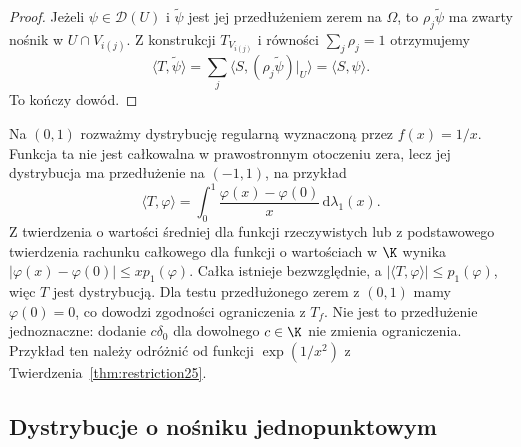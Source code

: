 \begin{proof}
Jeżeli $\psi\in\mathcal D(U)$ i $\widetilde\psi$
jest jej przedłużeniem zerem na $\Omega$, to
$\rho_j\widetilde\psi$ ma zwarty nośnik w $U\cap V_{i(j)}$.
Z konstrukcji $T_{V_{i(j)}}$ i równości $\sum_j\rho_j=1$
otrzymujemy
\[
 \langle T,\widetilde\psi\rangle
 =\sum_j\langle S,(\rho_j\widetilde\psi)|_U\rangle
 =\langle S,\psi\rangle.
\]
To kończy dowód.
\end{proof}

\begin{przyklad}
\label{ex:dt-extension-inverse-x}
Na $(0,1)$ rozważmy dystrybucję regularną wyznaczoną
przez $f(x)=1/x$. Funkcja ta nie jest całkowalna
w prawostronnym otoczeniu zera, lecz jej dystrybucja
ma przedłużenie na $(-1,1)$, na przykład
\[
 \langle T,\varphi\rangle
 =\int_0^1\frac{\varphi(x)-\varphi(0)}{x}\,
              \mathrm d\lambda_1(x).
\]
Z twierdzenia o wartości średniej dla funkcji rzeczywistych
lub z podstawowego twierdzenia rachunku całkowego dla
funkcji o wartościach w $\K$ wynika
$|\varphi(x)-\varphi(0)|\le x p_1(\varphi)$.
Całka istnieje bezwzględnie, a
$|\langle T,\varphi\rangle|\le p_1(\varphi)$,
więc $T$ jest dystrybucją.
Dla testu przedłużonego zerem z $(0,1)$ mamy
$\varphi(0)=0$, co dowodzi zgodności ograniczenia z $T_f$.
Nie jest to przedłużenie jednoznaczne: dodanie
$c\delta_0$ dla dowolnego $c\in\K$ nie zmienia ograniczenia.
Przykład ten należy odróżnić od funkcji
$\exp(1/x^2)$ z Twierdzenia~\ref{thm:restriction25}.
\end{przyklad}

\subsection{Dystrybucje o nośniku jednopunktowym}

